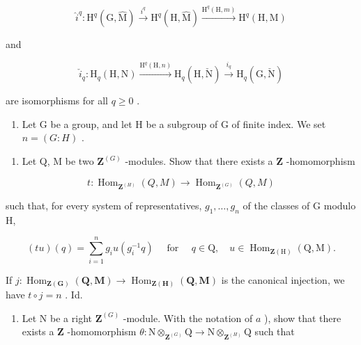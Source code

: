 \[
\hat {i} ^ {q}: \mathrm{H} ^ {q} (\mathrm{G}, \hat {\mathrm{M}}) \xrightarrow {i ^ {q}} \mathrm{H} ^ {q} (\mathrm{H}, \hat {\mathrm{M}}) \xrightarrow {\mathrm{H} ^ {q} (\mathrm{H} , m)} \mathrm{H} ^ {q} (\mathrm{H}, \mathrm{M})
\]

and

\[
\check {i} _ {q}: \mathrm{H} _ {q} (\mathrm{H}, \mathrm{N}) \xrightarrow {\mathrm{H} ^ {q} (\mathrm{H} , n)} \mathrm{H} _ {q} (\mathrm{H}, \check {\mathrm{N}}) \xrightarrow {i _ {q}} \mathrm{H} _ {q} (\mathrm{G}, \check {\mathrm{N}})
\]

are isomorphisms for all \(q \geqslant 0\) .

\begin{enumerate}
\def\labelenumi{\arabic{enumi})}
\setcounter{enumi}{13}
\tightlist
\item
  Let G be a group, and let H be a subgroup of G of finite index. We set \(n = (G:H)\) .
\end{enumerate}

\begin{enumerate}
\def\labelenumi{\alph{enumi})}
\tightlist
\item
  Let Q, M be two \(\mathbf{Z}^{(G)}\) -modules. Show that there exists a \(\mathbf{Z}\) -homomorphism
\end{enumerate}

\[
t: \operatorname{Hom} _ {\mathbf {Z} ^ {(H)}} (Q, M) \rightarrow \operatorname{Hom} _ {\mathbf {Z} ^ {(G)}} (Q, M)
\]

such that, for every system of representatives, \(g_{1}, \ldots, g_{n}\) of the classes of G modulo H,

\[
(t u) (q) = \sum_ {i = 1} ^ {n} g _ {i} u \left(g _ {i} ^ {- 1} q\right) \quad \text { for } \quad q \in \mathrm{Q}, \quad u \in \operatorname{Hom} _ {\mathbf {Z} (\mathrm{H})} (\mathrm{Q}, \mathrm{M}).
\]

If \(j: \operatorname{Hom}_{\mathbf{Z}(\mathbf{G})}(\mathbf{Q}, \mathbf{M}) \to \operatorname{Hom}_{\mathbf{Z}(\mathbf{H})}(\mathbf{Q}, \mathbf{M})\) is the canonical injection, we have \(t \circ j = n\) . Id.

\begin{enumerate}
\def\labelenumi{\alph{enumi})}
\setcounter{enumi}{1}
\tightlist
\item
  Let N be a right \(\mathbf{Z}^{(G)}\) -module. With the notation of \(a\) ), show that there exists a \(\mathbf{Z}\) -homomorphism \(\theta: \mathrm{N} \otimes_{\mathbf{Z}^{(G)}} \mathrm{Q} \to \mathrm{N} \otimes_{\mathbf{Z}^{(H)}} \mathrm{Q}\) such that
\end{enumerate}

